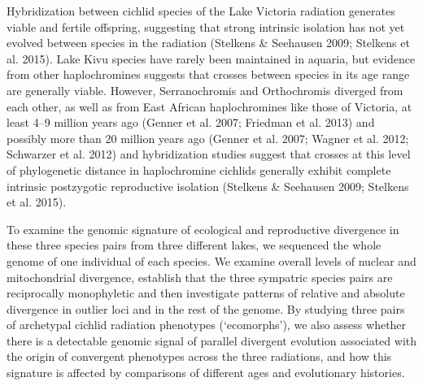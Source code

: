 Hybridization between cichlid species of the Lake Victoria radiation generates viable and fertile offspring, suggesting that strong intrinsic isolation has not yet evolved between species in the radiation (Stelkens & Seehausen 2009; Stelkens et al. 2015). Lake Kivu species have rarely been maintained in aquaria, but evidence from other haplochromines suggests that crosses between species in its age range are generally viable. However, Serranochromis and Orthochromis diverged from each other, as well as from East African haplochromines like those of Victoria, at least 4–9 million years ago (Genner et al. 2007; Friedman et al. 2013) and possibly more than 20 million years ago (Genner et al. 2007; Wagner et al. 2012; Schwarzer et al. 2012) and hybridization studies suggest that crosses at this level of phylogenetic distance in haplochromine cichlids generally exhibit complete intrinsic postzygotic reproductive isolation (Stelkens & Seehausen 2009; Stelkens et al. 2015).

To examine the genomic signature of ecological and reproductive divergence in these three species pairs from three different lakes, we sequenced the whole genome of one individual of each species. We examine overall levels of nuclear and mitochondrial divergence, establish that the three sympatric species pairs are reciprocally monophyletic and then investigate patterns of relative and absolute divergence in outlier loci and in the rest of the genome. By studying three pairs of archetypal cichlid radiation phenotypes (‘ecomorphs’), we also assess whether there is a detectable genomic signal of parallel divergent evolution associated with the origin of convergent phenotypes across the three radiations, and how this signature is affected by comparisons of different ages and evolutionary histories.
